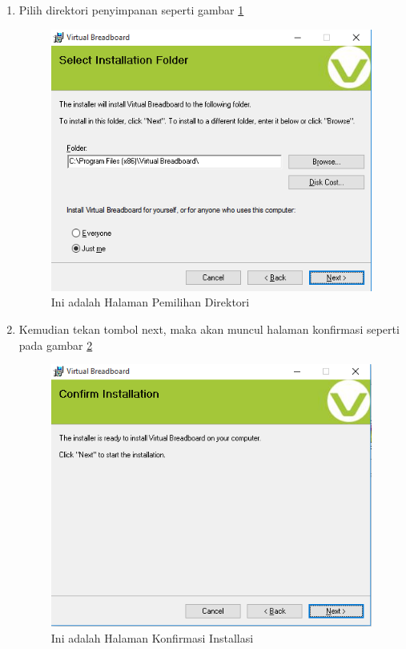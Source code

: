 \begin{enumerate}
\item Pilih direktori penyimpanan seperti gambar \ref{fig:memilihdirektori}
\begin{figure}[!htbp]
  \centering
  \includegraphics[width=.75\textwidth]{figures/VBB/memilihdirektori.png}
  \caption{Ini adalah Halaman Pemilihan Direktori}\label{fig:memilihdirektori}
\end{figure}


\item Kemudian tekan tombol next, maka akan muncul halaman konfirmasi seperti pada gambar \ref{fig:konfirmasiinstall}
\begin{figure}[!htbp]
  \centering
  \includegraphics[width=.75\textwidth]{figures/VBB/konfirmasiinstall.png}
  \caption{Ini adalah Halaman Konfirmasi Installasi}\label{fig:konfirmasiinstall}
\end{figure}


\end{enumerate}
